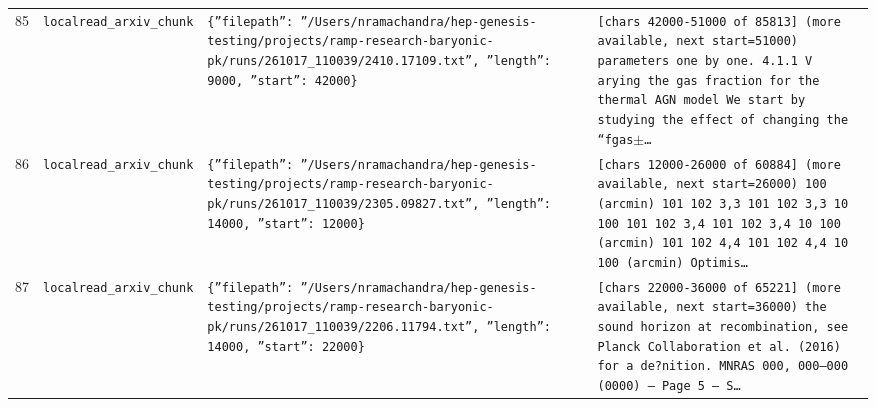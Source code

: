\documentclass[11pt,a4paper]{article}
\begin{document}
\begin{longtable}{@{}p{}p{}p{}p{}@{}}
85 & \texttt{local}\newline\texttt{read\_\allowbreak{}arxiv\_\allowbreak{}chunk} & \texttt{\{''filepath'':\allowbreak{} ''/\allowbreak{}Users/\allowbreak{}nramachandra/\allowbreak{}hep-genesis-testing/\allowbreak{}projects/\allowbreak{}ramp-research-baryonic-pk/\allowbreak{}runs/\allowbreak{}261017\_\allowbreak{}110039/\allowbreak{}2410.17109.txt'',\allowbreak{} ''length'':\allowbreak{} 9000,\allowbreak{} ''start'':\allowbreak{} 42000\}\allowbreak{}} & \texttt{[chars 42000-51000 of 85813]\allowbreak{} (more available,\allowbreak{} next start=\allowbreak{}51000)\allowbreak{}  parameters one by one. 4.1.1 V arying the gas fraction for the thermal AGN model We start by studying the effect of changing the ``fgas$\pm$\ldots{}\allowbreak{}} \\
86 & \texttt{local}\newline\texttt{read\_\allowbreak{}arxiv\_\allowbreak{}chunk} & \texttt{\{''filepath'':\allowbreak{} ''/\allowbreak{}Users/\allowbreak{}nramachandra/\allowbreak{}hep-genesis-testing/\allowbreak{}projects/\allowbreak{}ramp-research-baryonic-pk/\allowbreak{}runs/\allowbreak{}261017\_\allowbreak{}110039/\allowbreak{}2305.09827.txt'',\allowbreak{} ''length'':\allowbreak{} 14000,\allowbreak{} ''start'':\allowbreak{} 12000\}\allowbreak{}} & \texttt{[chars 12000-26000 of 60884]\allowbreak{} (more available,\allowbreak{} next start=\allowbreak{}26000)\allowbreak{}   100  (arcmin)\allowbreak{} 101 102 3,\allowbreak{}3 101 102 3,\allowbreak{}3 10 100 101 102 3,\allowbreak{}4 101 102 3,\allowbreak{}4 10 100  (arcmin)\allowbreak{} 101 102 4,\allowbreak{}4 101 102 4,\allowbreak{}4 10 100  (arcmin)\allowbreak{} Optimis\ldots{}\allowbreak{}} \\
87 & \texttt{local}\newline\texttt{read\_\allowbreak{}arxiv\_\allowbreak{}chunk} & \texttt{\{''filepath'':\allowbreak{} ''/\allowbreak{}Users/\allowbreak{}nramachandra/\allowbreak{}hep-genesis-testing/\allowbreak{}projects/\allowbreak{}ramp-research-baryonic-pk/\allowbreak{}runs/\allowbreak{}261017\_\allowbreak{}110039/\allowbreak{}2206.11794.txt'',\allowbreak{} ''length'':\allowbreak{} 14000,\allowbreak{} ''start'':\allowbreak{} 22000\}\allowbreak{}} & \texttt{[chars 22000-36000 of 65221]\allowbreak{} (more available,\allowbreak{} next start=\allowbreak{}36000)\allowbreak{}  the sound horizon at recombination,\allowbreak{} see Planck Collaboration et al. (2016)\allowbreak{} for a de?nition. MNRAS 000,\allowbreak{} 000--000 (0000)\allowbreak{}  --- Page 5 --- S\ldots{}\allowbreak{}} \\

\end{longtable}
\end{document}
